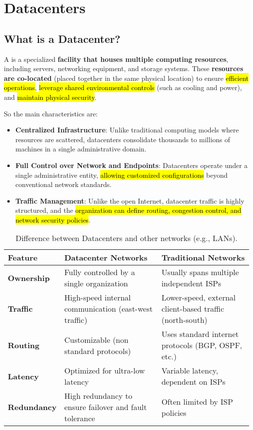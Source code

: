 \section{Datacenters}

\subsection{What is a Datacenter?}
A  is a specialized \textbf{facility that houses multiple computing resources}, including servers, networking equipment, and storage systems. These \textbf{resources are co-located} (placed together in the same physical location) to ensure \hl{efficient operations}, \hl{leverage shared environmental controls} (such as cooling and power), and \hl{maintain physical security}.

\highspace
So the main characteristics are:
\begin{itemize}
    \item \textbf{Centralized Infrastructure}: Unlike traditional computing models where resources are scattered, datacenters consolidate thousands to millions of machines in a single administrative domain.
    \item \textbf{Full Control over Network and Endpoints}: Datacenters operate under a single administrative entity, \hl{allowing customized configurations} beyond conventional network standards.
    \item \textbf{Traffic Management}: Unlike the open Internet, datacenter traffic is highly structured, and the \hl{organization can define routing, congestion control, and network security policies}.
\end{itemize}

\begin{table}[!htp]
    \centering
    \begin{tabular}{@{} l p{12.8em} p{12.8em} @{}}
        \toprule
        \textbf{Feature} & \textbf{Datacenter Networks} & \textbf{Traditional Networks} \\
        \midrule
        \textbf{Ownership}  & Fully controlled by a single organization & Usually spans multiple independent ISPs \\ [.5em]
        \textbf{Traffic}    & High-speed internal communication (east-west traffic) & Lower-speed, external client-based traffic (north-south) \\ [.5em]
        \textbf{Routing}    & Customizable (non standard protocols) & Uses standard internet protocols (BGP, OSPF, etc.) \\ [.5em]
        \textbf{Latency}    & Optimized for ultra-low latency & Variable latency, dependent on ISPs \\ [.5em]
        \textbf{Redundancy} & High redundancy to ensure failover and fault tolerance & Often limited by ISP policies \\
        \bottomrule
    \end{tabular}
    \caption{Difference between Datacenters and other networks (e.g., LANs).}
\end{table}

